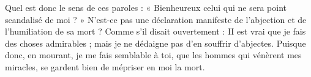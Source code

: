Quel est donc le sens de ces paroles : « Bienheureux celui qui ne sera point scandalisé de moi ? » N’est-ce pas une déclaration manifeste de l’abjection et de l’humiliation de sa mort ? Comme s’il disait ouvertement : II est vrai que je fais des choses admirables ; mais je ne dédaigne pas d’en souffrir d’abjectes. Puisque donc, en mourant, je me fais semblable à toi, que les hommes qui vénèrent mes miracles, se gardent bien de mépriser en moi la mort.